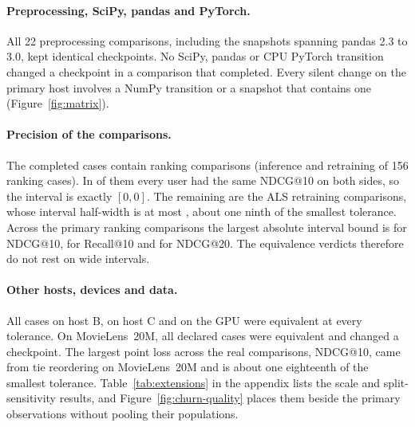 \documentclass[11pt,a4paper]{article}
\begin{document}
\paragraph{Preprocessing, SciPy, pandas and PyTorch.} All 22 preprocessing
comparisons, including the snapshots spanning pandas 2.3 to 3.0, kept
identical checkpoints. No SciPy, pandas or CPU PyTorch transition changed a
checkpoint in a comparison that completed. Every silent change on the primary
host involves a NumPy transition or a snapshot that contains one
(Figure~\ref{fig:matrix}).

\paragraph{Precision of the comparisons.} The \nCompleted{} completed cases
contain \nCaseModes{} ranking comparisons (inference and retraining of 156
ranking cases). In \nDegenerate{} of them every user had the same NDCG@10 on
both sides, so the interval is exactly $[0,0]$. The remaining
\nNonDegenerate{} are the ALS retraining comparisons, whose interval
half-width is at most \maxHalfWidth{}, about one ninth of the smallest
tolerance. Across the primary ranking comparisons the largest absolute interval bound is
\worstNdcgTen{} for NDCG@10, \worstRecallTen{} for Recall@10 and
\worstNdcgTwenty{} for NDCG@20. The equivalence verdicts therefore do not rest
on wide intervals.

\paragraph{Other hosts, devices and data.}
All \nHostB{} cases on host B, \nHostC{} on host C and \nHostGpu{} on the GPU
were equivalent at every tolerance. On MovieLens~20M, all \nMLtwentyCases{}
declared cases were equivalent and \nMLtwentyChanged{} changed a checkpoint.
The largest point loss across the real comparisons, \lossMOneMLtwenty{}
NDCG@10, came from tie reordering on MovieLens~20M and is about one eighteenth
of the smallest tolerance. Table~\ref{tab:extensions} in the appendix lists the
scale and split-sensitivity results, and Figure~\ref{fig:churn-quality} places
them beside the primary observations without pooling their populations.
\end{document}
